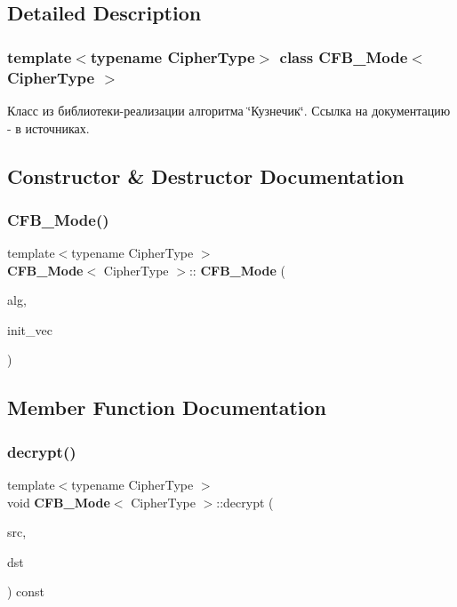 \subsection{Detailed Description}
\subsubsection*{template$<$typename Cipher\+Type$>$\newline
class C\+F\+B\+\_\+\+Mode$<$ Cipher\+Type $>$}

Класс из библиотеки-\/реализации алгоритма \char`\"{}Кузнечик\char`\"{}. Ссылка на документацию -\/ в источниках. 

\subsection{Constructor \& Destructor Documentation}
\mbox{\label{class_c_f_b___mode_a191bd9146ea20372148bbd10f25cb5d5}} 
\subsubsection{C\+F\+B\+\_\+\+Mode()}
{\footnotesize\ttfamily template$<$typename Cipher\+Type $>$ \\
\textbf{ C\+F\+B\+\_\+\+Mode}$<$ Cipher\+Type $>$\+::\textbf{ C\+F\+B\+\_\+\+Mode} (\begin{DoxyParamCaption}\item[{const Cipher\+Type \&}]{alg,  }\item[{const \textbf{ Byte\+Block} \&}]{init\+\_\+vec }\end{DoxyParamCaption})}



\subsection{Member Function Documentation}
\mbox{\label{class_c_f_b___mode_a26084270b140d8f353d57dc1956a957b}} 
\subsubsection{decrypt()}
{\footnotesize\ttfamily template$<$typename Cipher\+Type $>$ \\
void \textbf{ C\+F\+B\+\_\+\+Mode}$<$ Cipher\+Type $>$\+::decrypt (\begin{DoxyParamCaption}\item[{const \textbf{ Byte\+Block} \&}]{src,  }\item[{\textbf{ Byte\+Block} \&}]{dst }\end{DoxyParamCaption}) const}

